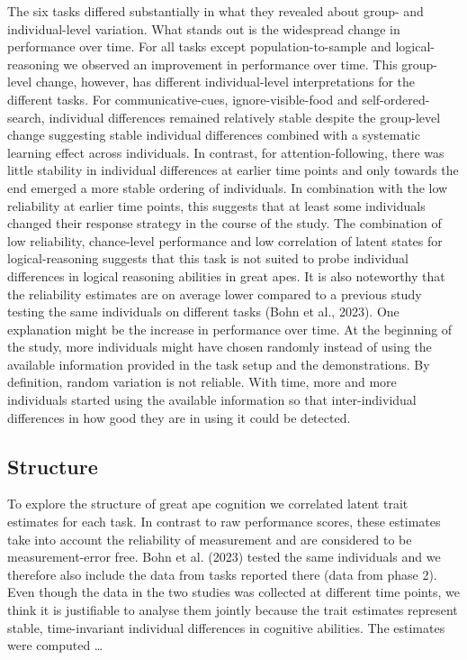 \documentclass[
  man,floatsintext]{apa6}
\begin{document}
The six tasks differed substantially in what they revealed about group- and individual-level variation. What stands out is the widespread change in performance over time. For all tasks except population-to-sample and logical-reasoning we observed an improvement in performance over time. This group-level change, however, has different individual-level interpretations for the different tasks. For communicative-cues, ignore-visible-food and self-ordered-search, individual differences remained relatively stable despite the group-level change suggesting stable individual differences combined with a systematic learning effect across individuals. In contrast, for attention-following, there was little stability in individual differences at earlier time points and only towards the end emerged a more stable ordering of individuals. In combination with the low reliability at earlier time points, this suggests that at least some individuals changed their response strategy in the course of the study. The combination of low reliability, chance-level performance and low correlation of latent states for logical-reasoning suggests that this task is not suited to probe individual differences in logical reasoning abilities in great apes. It is also noteworthy that the reliability estimates are on average lower compared to a previous study testing the same individuals on different tasks (Bohn et al., 2023). One explanation might be the increase in performance over time. At the beginning of the study, more individuals might have chosen randomly instead of using the available information provided in the task setup and the demonstrations. By definition, random variation is not reliable. With time, more and more individuals started using the available information so that inter-individual differences in how good they are in using it could be detected.

\hypertarget{structure}{%
\subsection{Structure}\label{structure}}

To explore the structure of great ape cognition we correlated latent trait estimates for each task. In contrast to raw performance scores, these estimates take into account the reliability of measurement and are considered to be measurement-error free. Bohn et al. (2023) tested the same individuals and we therefore also include the data from tasks reported there (data from phase 2). Even though the data in the two studies was collected at different time points, we think it is justifiable to analyse them jointly because the trait estimates represent stable, time-invariant individual differences in cognitive abilities. The estimates were computed \ldots{}
\end{document}

